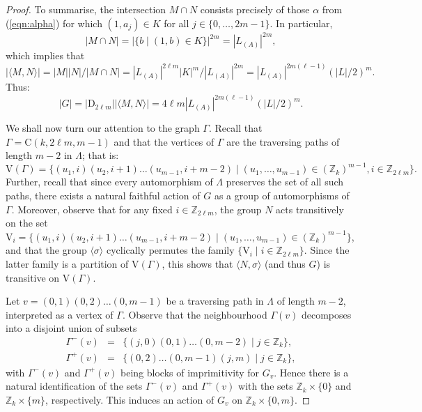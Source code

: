 \documentclass{amsart}
\theoremstyle{definition}
\begin{document}
\begin{proof}
To summarise, the intersection $M\cap N$ consists precisely of those $\alpha$ from (\ref{eqn:alpha}) for which
$(1,a_j) \in K$ for all $j\in \{0,\ldots,2m-1\}$. In particular, 
$$
 |M\cap N| = |\{b \mid (1,b) \in K\}|^{2m} = |L_{(A)}|^{2m},
$$ 
which implies that
$$
|\langle M, N \rangle| = |M| |N| / |M\cap N| = |L_{(A)}|^{2\ell m} |K|^m / |L_{(A)}|^{2m} = |L_{(A)}|^{2 m (\ell -1)} (|L|/2)^m.
$$
Thus:
\begin{equation}
\label{eqn:|G|}
|G| = |{\mathrm D}_{2\ell m}| |\langle M, N \rangle| = 4\ell m  |L_{(A)}|^{2 m (\ell -1)} (|L|/2)^m.
\end{equation}
\medskip

We shall now turn our attention to the graph  $\Gamma$. Recall that $\Gamma={\mathrm C}(k,2\ell m,m-1)$ and that the vertices of $\Gamma$ are the traversing paths of length $m-2$ in $\Lambda$; that is:
$${\mathrm V}(\Gamma)=\{ (u_1,i)(u_2,i+1)\ldots (u_{m-1},i+m-2) \mid (u_1, \ldots, u_{m-1}) \in({\mathbb Z}_k)^{m-1},i\in{\mathbb Z}_{2\ell m}\}.$$
Further, recall that since every automorphism of $\Lambda$ preserves the set of all such paths, there exists a natural faithful action of $G$ as a group of automorphisms of $\Gamma$. Moreover, observe that for any fixed $i\in {\mathbb Z}_{2\ell m}$, the group $N$ acts transitively on the set ${\mathrm V}_i = \{(u_1,i)(u_2,i+1)\ldots (u_{m-1},i+m-2) \mid (u_1, \ldots, u_{m-1}) \in({\mathbb Z}_k)^{m-1}\}$, and that the group ${\langle} \sigma {\rangle}$ cyclically permutes the family $\{ {\mathrm V}_i \mid i\in {\mathbb Z}_{2\ell m}\}$. Since the latter family is a partition of ${\mathrm V}(\Gamma)$, this shows that ${\langle} N, \sigma {\rangle}$ (and thus $G$) is transitive on ${\mathrm V}(\Gamma)$.

Let  $v=(0,1)(0,2)\ldots(0,m-1)$ be a traversing path in $\Lambda$ of length $m-2$, interpreted as a vertex of $\Gamma$. Observe that the neighbourhood $\Gamma(v)$ decomposes into a disjoint union of subsets
\begin{eqnarray*}
\Gamma^-(v) & = & \{(j,0)(0,1)\ldots(0,m-2)\mid j\in{\mathbb Z}_k\}, \\
\Gamma^+(v) & = & \{(0,2)\ldots(0,m-1)(j,m)\mid j\in{\mathbb Z}_k\},
 \end{eqnarray*}
with $\Gamma^-(v)$ and $\Gamma^+(v)$ being blocks of imprimitivity for $G_v$. Hence there is a natural identification of the sets $\Gamma^-(v)$ and $\Gamma^+(v)$ with the sets ${\mathbb Z}_k \times \{0\}$ and ${\mathbb Z}_k \times \{m\}$, respectively. This induces an action of $G_v$ on ${\mathbb Z}_k\times\{0,m\}$.
 

\end{proof}
\end{document}
